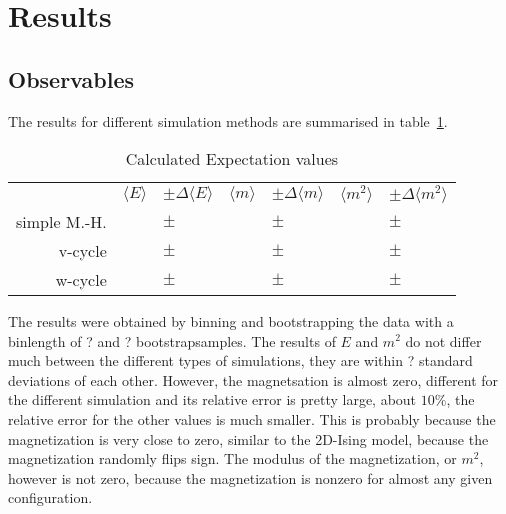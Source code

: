 \documentclass{scrartcl}
\begin{document}
\section{Results}
 

\subsection{Observables}

The results for different simulation methods are summarised in table~\ref{tab:results}.

\begin{table}[htbp]
	\begin{center}
	\begin{tabular}{r|rl|rl|rl}
& $\langle E \rangle$ & $\pm\Delta \langle E \rangle$ & $\langle m \rangle$ & $\pm\Delta\langle m \rangle$ & $\langle m^2 \rangle$ & $\pm\Delta \langle m^2 \rangle$ \\
simple M.-H. &                     &             $\pm$             &                     &            $\pm$             &                       &              $\pm$              \\
v-cycle &                     &             $\pm$             &                     &            $\pm$             &                       &              $\pm$              \\
w-cycle &                     &             $\pm$             &                     &            $\pm$             &                       &              $\pm$
	\end{tabular}
	\end{center}
	\caption{Calculated Expectation values}
	\label{tab:results}
\end{table}

The results were obtained by binning and bootstrapping the data with a binlength of ? and ? bootstrapsamples. The results of $E$ and $m^2$ do not differ much between the different types of simulations, they are within ? standard deviations of each other. However, the magnetsation is almost zero, different for the different simulation and its relative error is pretty large, about $10\%$, the relative error for the other values is much smaller. This is probably because the magnetization is very close to zero, similar to the 2D-Ising model, because the magnetization randomly flips sign. The modulus of the magnetization, or $m^2$, however is not zero, because the magnetization is nonzero for almost any given configuration.
\end{document}
